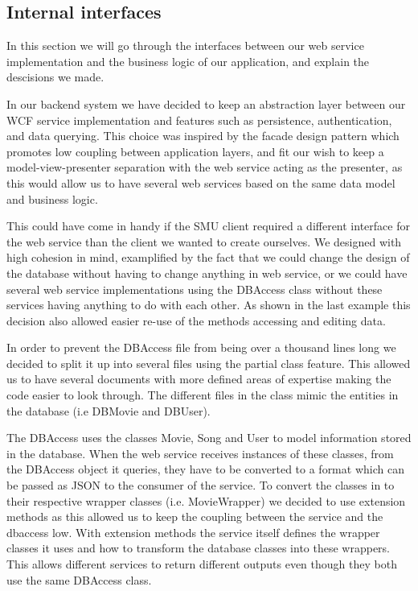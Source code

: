 \subsection{Internal interfaces}
In this section we will go through the interfaces between our web service implementation and the business logic of our application, and explain the descisions we made.

In our backend system we have decided to keep an abstraction layer between our WCF service implementation and features such as persistence, authentication, and data querying. This choice was inspired by the facade design pattern which promotes low coupling between application layers, and fit our wish to keep a model-view-presenter separation with the web service acting as the presenter, as this would allow us to have several web services based on the same data model and business logic.

This could have come in handy if the SMU client required a different interface for the web service than the client we wanted to create ourselves. We designed with high cohesion in mind, examplified by the fact that we could change the design of the database without having to change anything in web service, or we could have several web service implementations using the DBAccess class without these services having anything to do with each other. As shown in the last example this decision also allowed easier re-use of the methods accessing and editing data.

In order to prevent the DBAccess file from being over a thousand lines long we decided to split it up into several files using the partial class feature. This allowed us to have several documents with more defined areas of expertise making the code easier to look through.  The different files in the class mimic the entities in the database (i.e DBMovie and DBUser).

The DBAccess uses the classes Movie, Song and User to model information stored in the database. When the web service receives instances of these classes, from the DBAccess object it queries, they have to be converted to a format which can be passed as JSON to the consumer of the service. To convert the classes in to their respective wrapper classes (i.e. MovieWrapper) we decided to use extension methods as this allowed us to keep the coupling between the service and the dbaccess low. With extension methods the service itself defines the wrapper classes it uses and how to transform the database classes into these wrappers. This allows different services to return different outputs even though they both use the same DBAccess class.